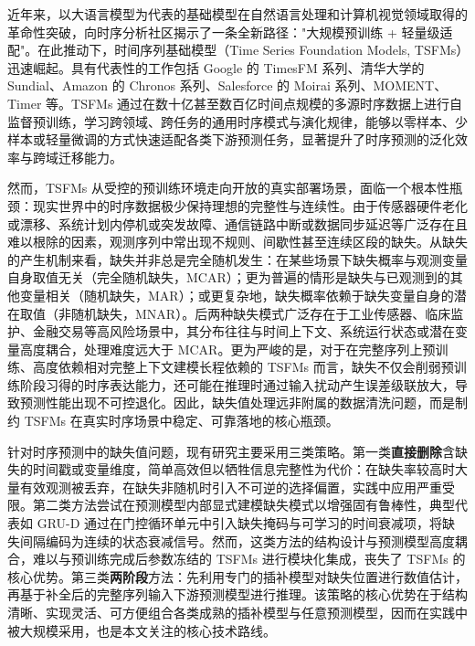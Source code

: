 \documentclass{article}
\begin{document}
近年来，以大语言模型为代表的基础模型在自然语言处理和计算机视觉领域取得的革命性突破，向时序分析社区揭示了一条全新路径："大规模预训练 + 轻量级适配"。在此推动下，时间序列基础模型（Time Series Foundation Models, TSFMs）迅速崛起\cite{liang2024}。具有代表性的工作包括 Google 的 TimesFM 系列\cite{pmlr-v235-das24c}、清华大学的 Sundial\cite{pmlr-v267-liu25be}、Amazon 的 Chronos 系列\cite{ansari2024chronos,ansari2025chronos2univariateuniversalforecasting}、Salesforce 的 Moirai 系列\cite{10.5555/3692070.3694248,liu2026moirai20timeseries}、MOMENT\cite{pmlr-v235-goswami24a}、Timer\cite{liu2024timer} 等。TSFMs 通过在数十亿甚至数百亿时间点规模的多源时序数据上进行自监督预训练，学习跨领域、跨任务的通用时序模式与演化规律，能够以零样本、少样本或轻量微调的方式快速适配各类下游预测任务，显著提升了时序预测的泛化效率与跨域迁移能力\cite{JCC-CN-202400146}。

然而，TSFMs 从受控的预训练环境走向开放的真实部署场景，面临一个根本性瓶颈：现实世界中的时序数据极少保持理想的完整性与连续性。由于传感器硬件老化或漂移\cite{10184665}、系统计划内停机或突发故障\cite{BAI2008304}、通信链路中断或数据同步延迟\cite{9403954}等广泛存在且难以根除的因素，观测序列中常出现不规则、间歇性甚至连续区段的缺失。从缺失的产生机制来看，缺失并非总是完全随机发生：在某些场景下缺失概率与观测变量自身取值无关（完全随机缺失，MCAR）；更为普遍的情形是缺失与已观测到的其他变量相关（随机缺失，MAR）；或更复杂地，缺失概率依赖于缺失变量自身的潜在取值（非随机缺失，MNAR）\cite{che2018}。后两种缺失模式广泛存在于工业传感器、临床监护、金融交易等高风险场景中，其分布往往与时间上下文、系统运行状态或潜在变量高度耦合，处理难度远大于 MCAR。更为严峻的是，对于在完整序列上预训练、高度依赖相对完整上下文建模长程依赖的 TSFMs 而言，缺失不仅会削弱预训练阶段习得的时序表达能力，还可能在推理时通过输入扰动产生误差级联放大，导致预测性能出现不可控退化\cite{emmanuel2021}。因此，缺失值处理远非附属的数据清洗问题，而是制约 TSFMs 在真实时序场景中稳定、可靠落地的核心瓶颈。

针对时序预测中的缺失值问题，现有研究主要采用三类策略。第一类\textbf{直接删除}含缺失的时间戳或变量维度，简单高效但以牺牲信息完整性为代价：在缺失率较高时大量有效观测被丢弃，在缺失非随机时引入不可逆的选择偏置，实践中应用严重受限。第二类方法尝试在预测模型内部显式建模缺失模式以增强固有鲁棒性，典型代表如 GRU-D\cite{che2018} 通过在门控循环单元中引入缺失掩码与可学习的时间衰减项，将缺失间隔编码为连续的状态衰减信号。然而，这类方法的结构设计与预测模型高度耦合，难以与预训练完成后参数冻结的 TSFMs 进行模块化集成，丧失了 TSFMs 的核心优势。第三类\textbf{两阶段}方法：先利用专门的插补模型对缺失位置进行数值估计，再基于补全后的完整序列输入下游预测模型进行推理。该策略的核心优势在于结构清晰、实现灵活、可方便组合各类成熟的插补模型与任意预测模型，因而在实践中被大规模采用，也是本文关注的核心技术路线。
\end{document}
